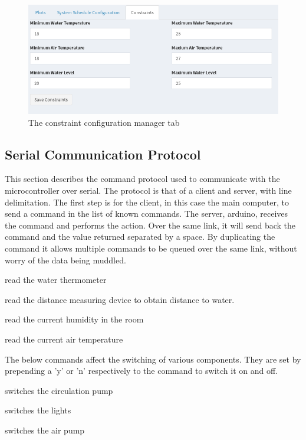 \documentclass[american,12pt]{article}
\begin{document}
\begin{figure}[h]
	\includegraphics[width=\linewidth]{imgs/constraints}
	\caption{The constraint configuration manager tab}
	\label{fig:constraints}
\end{figure}

\subsection{Serial Communication Protocol}
This section describes the command protocol used to communicate with the
microcontroller over serial. The protocol is that of a client and server,
with line delimitation. The first step is for the client, in this case the
main computer, to send a command in the list of known commands. The server,
arduino, receives the command and performs the action. Over the same link, it
will send back the command and the value returned separated by a space. By
duplicating the command it allows multiple commands to be queued over the same
link, without worry of the data being muddled.

\begin{description}[style=nextline]
    \item[rWatThm] read the water thermometer
    \item[rdWaLvl] read the distance measuring device to obtain distance to water.
    \item[rdHumid] read the current humidity in the room
    \item[rdAirTm] read the current air temperature
\end{description}

The below commands affect the switching of various components. They are set by
prepending a 'y' or 'n' respectively to the command to switch it on and off.

\begin{description}[style=nextline]
    \item[CiPump] switches the circulation pump
    \item[Lights] switches the lights
    \item[AirPmp] switches the air pump
\end{description}
\end{document}

